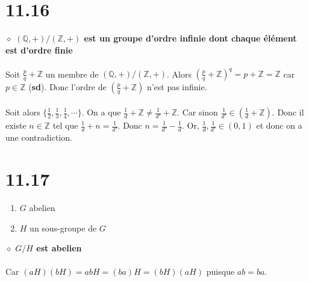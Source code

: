 \documentclass[a4paper,10pt]{article}
\begin{document}
\section*{11.16}
$\diamond$ \textbf{$(\mathbb{Q}, +) / (\mathbb{Z}, +)$ est un groupe d'ordre infinie dont chaque élément est d'ordre finie}
\\
\\
Soit $\frac{p}{q} + \mathbb{Z}$ un membre de $(\mathbb{Q}, +)/(\mathbb{Z}, +)$. Alors $(\frac{p}{q} + \mathbb{Z})^q = p + \mathbb{Z} = \mathbb{Z}$ car $p \in \mathbb{Z}$ (\textbf{sd}). Donc l'ordre de $(\frac{p}{q} + \mathbb{Z})$ n'est pas infinie.
\\
\\
Soit alors $\{\frac{1}{2}, \frac{1}{3}, \frac{1}{4}, \cdots \}$. On a que $\frac{1}{d} + \mathbb{Z} \neq \frac{1}{d'} + \mathbb{Z}$. Car sinon $\frac{1}{d'} \in (\frac{1}{d} + \mathbb{Z})$. Donc il existe $n \in \mathbb{Z}$ tel que $\frac{1}{d} + n = \frac{1}{d'}$. Donc $n = \frac{1}{d'} - \frac{1}{d}$. Or, $\frac{1}{d}, \frac{1}{d'} \in (0,1)$ et donc on a une contradiction.

\section*{11.17}
\begin{enumerate}
	\item $G$ abelien
	\item $H$ un sous-groupe de $G$
\end{enumerate}
$\diamond$ \textbf{$G/H$ est abelien}
\\
\\
Car $(aH)(bH) = abH = (ba)H = (bH)(aH)$ puisque $ab = ba$.
\end{document}
